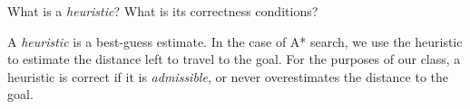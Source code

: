 \question What is a \emph{heuristic}? What is its correctness conditions?

\begin{solution}[1in]
A \emph{heuristic} is a best-guess estimate. In the case of A* search, we use
the heuristic to estimate the distance left to travel to the goal. For the
purposes of our class, a heuristic is correct if it is \emph{admissible}, or
never overestimates the distance to the goal.
\end{solution}
